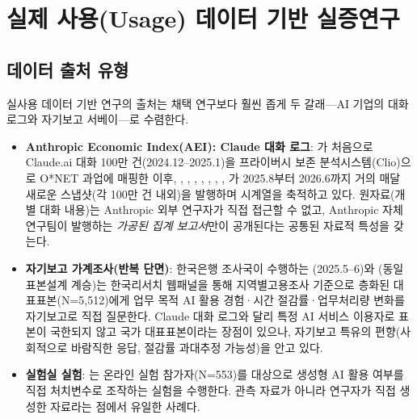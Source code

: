 \documentclass[11pt]{article}
\begin{document}
\section{실제 사용(Usage) 데이터 기반 실증연구}
\label{sec:usage}

\subsection{데이터 출처 유형}

실사용 데이터 기반 연구의 출처는 채택 연구보다 훨씬 좁게 두 갈래—AI 기업의 대화 로그와 자기보고 서베이—로 수렴한다.

\begin{itemize}[leftmargin=*]
  \item \textbf{Anthropic Economic Index(AEI): Claude 대화 로그}: \citet{handa-2025-which-economic-tasks-are}가 처음으로 Claude.ai 대화 100만 건(2024.12--2025.1)을 프라이버시 보존 분석시스템(Clio)으로 O*NET 과업에 매핑한 이후, \citet{tamkin-2025-estimating-ai-productivity-gains-from}, \citet{massenkoff-2026-labor-market-impacts-of-ai}, \citet{massenkoff-2026-cadences}, \citet{massenkoff-2026-learning-curves}, \citet{appel-2025-uneven-geographic-and-enterprise-ai}, \citet{appel-2026-economic-primitives}, \citet{fan-2026-what-countries-use-ai-and}, \citet{fan-2026-aggregate-gains-from-ai}가 2025.8부터 2026.6까지 거의 매달 새로운 스냅샷(각 100만 건 내외)을 발행하며 시계열을 축적하고 있다. 원자료(개별 대화 내용)는 Anthropic 외부 연구자가 직접 접근할 수 없고, Anthropic 자체 연구팀이 발행하는 \emph{가공된 집계 보고서}만이 공개된다는 공통된 자료적 특성을 갖는다.
  \item \textbf{자기보고 가계조사(반복 단면)}: 한국은행 조사국이 수행하는 \citet{bok-2025-rapid-ai-diffusion-productivity-effects}(2025.5--6)와 \citet{bok-2026-ai-adoption-productivity-effects}(동일 표본설계 계승)는 한국리서치 웹패널을 통해 지역별고용조사 기준으로 층화된 대표표본(N=5,512)에게 업무 목적 AI 활용 경험·시간 절감률·업무처리량 변화를 자기보고로 직접 질문한다. Claude 대화 로그와 달리 특정 AI 서비스 이용자로 표본이 국한되지 않고 국가 대표표본이라는 장점이 있으나, 자기보고 특유의 편향(사회적으로 바람직한 응답, 절감률 과대추정 가능성)을 안고 있다.
  \item \textbf{실험실 실험}: \citet{min-2025-productivity-gains-generative-ai}는 온라인 실험 참가자(N=553)를 대상으로 생성형 AI 활용 여부를 직접 처치변수로 조작하는 실험을 수행한다. 관측 자료가 아니라 연구자가 직접 생성한 자료라는 점에서 유일한 사례다.
\end{itemize}
\end{document}
